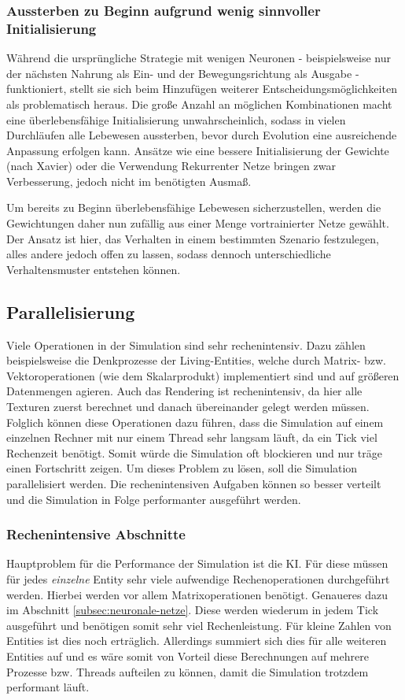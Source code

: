 \documentclass[course=erap]{aspdoc}
\begin{document}
\subsubsection{Aussterben zu Beginn aufgrund wenig sinnvoller Initialisierung}
\label{sssec:nn-problem}
Während die ursprüngliche Strategie mit wenigen Neuronen - beispielsweise nur der nächsten Nahrung als Ein- und der Bewegungsrichtung als Ausgabe - funktioniert, stellt sie sich beim Hinzufügen weiterer Entscheidungsmöglichkeiten als problematisch heraus. Die große Anzahl an möglichen Kombinationen macht eine überlebensfähige Initialisierung unwahrscheinlich, sodass in vielen Durchläufen alle Lebewesen aussterben, bevor durch Evolution eine ausreichende Anpassung erfolgen kann. Ansätze wie eine bessere Initialisierung der Gewichte (nach Xavier) oder die Verwendung Rekurrenter Netze bringen zwar Verbesserung, jedoch nicht im benötigten Ausmaß.

Um bereits zu Beginn überlebensfähige Lebewesen sicherzustellen, werden die Gewichtungen daher nun zufällig aus einer Menge vortrainierter Netze gewählt. Der Ansatz ist hier, das Verhalten in einem bestimmten Szenario festzulegen, alles andere jedoch offen zu lassen, sodass dennoch unterschiedliche Verhaltensmuster entstehen können.


\subsection{Parallelisierung}
Viele Operationen in der Simulation sind sehr rechenintensiv. Dazu zählen beispielsweise die Denkprozesse der Living-Entities, welche durch Matrix- bzw. Vektoroperationen (wie dem Skalarprodukt) implementiert sind und auf größeren Datenmengen agieren. Auch das Rendering ist rechenintensiv, da hier alle Texturen zuerst berechnet und danach übereinander gelegt werden müssen. Folglich können diese Operationen dazu führen, dass die Simulation auf einem einzelnen Rechner mit nur einem Thread sehr langsam läuft, da ein Tick viel Rechenzeit benötigt. Somit würde die Simulation oft blockieren und nur träge einen Fortschritt zeigen. Um dieses Problem zu lösen, soll die Simulation parallelisiert werden. Die rechenintensiven Aufgaben können so besser verteilt und die Simulation in Folge performanter ausgeführt werden.


\subsubsection{Rechenintensive Abschnitte}
Hauptproblem für die Performance der Simulation ist die KI. Für diese müssen für jedes \emph{einzelne} Entity sehr viele aufwendige Rechenoperationen durchgeführt werden. Hierbei werden vor allem Matrixoperationen benötigt. Genaueres dazu im Abschnitt \ref{subsec:neuronale-netze}. Diese werden wiederum in jedem Tick ausgeführt und benötigen somit sehr viel Rechenleistung. Für kleine Zahlen von Entities ist dies noch erträglich. Allerdings summiert sich dies für alle weiteren Entities auf und es wäre somit von Vorteil diese Berechnungen auf mehrere Prozesse bzw. Threads aufteilen zu können, damit die Simulation trotzdem performant läuft.
\end{document}
